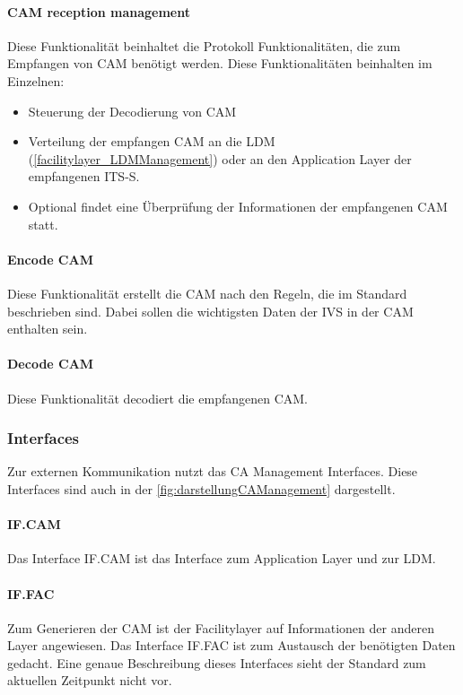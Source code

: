 \paragraph{CAM reception management}
Diese Funktionalität beinhaltet die Protokoll Funktionalitäten, die zum Empfangen von \ac{CAM} benötigt werden. Diese Funktionalitäten beinhalten im Einzelnen:
\begin{itemize}
	\item Steuerung der Decodierung von \ac{CAM}
	\item Verteilung der empfangen \ac{CAM} an die \ac{LDM} (\ref{facilitylayer_LDMManagement}) oder an den Application Layer der empfangenen \ac{ITS-S}.
	\item Optional findet eine Überprüfung der Informationen der empfangenen \ac{CAM} statt.
\end{itemize}

\paragraph{Encode CAM}
Diese Funktionalität erstellt die \ac{CAM} nach den Regeln, die im Standard \cite{en302637-2} beschrieben sind. Dabei sollen die wichtigsten Daten der \ac{IVS} in der \ac{CAM} enthalten sein.

\paragraph{Decode CAM}
Diese Funktionalität decodiert die empfangenen \ac{CAM}.


\subsubsection{Interfaces \label{facilitylayer_cam_interfaces}}
Zur externen Kommunikation nutzt das \ac{CA} Management Interfaces. Diese Interfaces sind auch in der  \autoref{fig:darstellungCAManagement} dargestellt. 

\paragraph{IF.CAM}
Das Interface IF.CAM ist das Interface zum Application Layer und zur \ac{LDM}. 

\paragraph{IF.FAC}
Zum Generieren der \ac{CAM} ist der Facilitylayer auf Informationen der anderen Layer angewiesen. Das Interface IF.FAC ist zum Austausch der benötigten Daten gedacht. Eine genaue Beschreibung dieses Interfaces sieht der Standard \cite{en302637-2} zum aktuellen Zeitpunkt nicht vor. 

